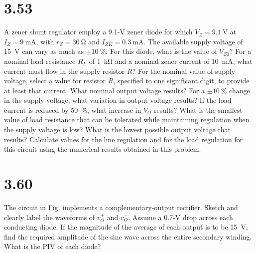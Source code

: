 \documentclass[12pt, a4paper]{article}
\theoremstyle{mystyle}	%
\begin{document}
\section{3.53}
A zener shunt regulator employ a 9.1-\si{\V} zener diode for which
$V_Z = \SI{9.1}{\V}$ at $I_Z = \SI{9}{\mA}$, with $r_Z = \SI{30}{\ohm}$
and $I_{ZK}=\SI{0.3}{\mA}$. The available supply voltage of \SI{15}{\V}
can vary as much as $\pm\SI{10}{\percent}$. For this diode, what is the
value of $V_{Z0}$? For a nominal load resistance $R_L$ of \SI{1}{\kohm}
and a nominal zener current of \SI{10}{\mA}, what current must flow
in the supply resistor $R$? For the nominal value of supply voltage,
select a value for resistor $R$, specified to one significant digit,
to provide at least that current. What nominal output voltage results?
For a $\pm\SI{10}{\percent}$ change in the supply voltage, what variation
in output voltage results? If the load current is reduced by
\SI{50}{\percent}, what increase in $V_O$ results? What is the smallest
value of load resistance that can be tolerated while maintaining
regulation when the supply voltage is low? What is the lowest possible
output voltage that results? Calculate values for the line regulation
and for the load regulation for this circuit using the numerical results
obtained in this problem.

\section{3.60}
The circuit in Fig. implements a complementary-output rectifier.
Sketch and clearly label the waveforms of $v_O^+$ and $v_O^-$.
Assume a 0.7-\si{\V} drop across each conducting diode. If the
magnitude of the average of each output is to be \SI{15}{\V}, find
the required amplitude of the sine wave across the entire secondary
winding. What is the PIV of each diode?

\begin{figure}[H]
  
\end{figure}

% 
\end{document}
